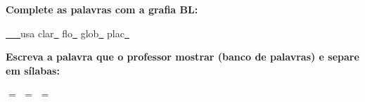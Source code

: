 \noindent\textbf{Complete as palavras com a grafia BL:}
\begin{center}
  \underline{~~~}usa \quad clar\underline{~} \quad flo\underline{~} \quad glob\underline{~} \quad plac\underline{~}
\end{center}

\noindent\textbf{Escreva a palavra que o professor mostrar (banco de palavras) e separe em sílabas:}

\begin{center}
  \underline{\hspace{2cm}} $=$ \underline{\hspace{2cm}} \quad \underline{\hspace{2cm}} $=$ \underline{\hspace{2cm}} \quad \underline{\hspace{2cm}} $=$ \underline{\hspace{2cm}}
  \end{center}



